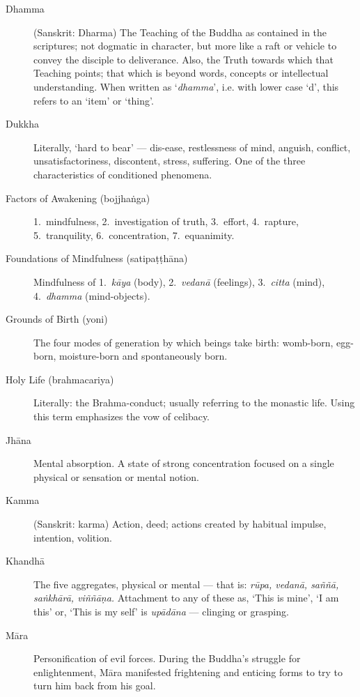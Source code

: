 \begin{description}
\item[Dhamma] (Sanskrit: Dharma) The Teaching of the Buddha as contained
  in the scriptures; not dogmatic in character, but more like a raft or
  vehicle to convey the disciple to deliverance. Also, the Truth towards
  which that Teaching points; that which is beyond words, concepts or
  intellectual understanding. When written as ‘\emph{dhamma}’, i.e.
  with lower case `d', this refers to an ‘item’ or ‘thing’.

\item[Dukkha] Literally, ‘hard to bear’ --- dis-ease, restlessness of
  mind, anguish, conflict, unsatisfactoriness, discontent, stress,
  suffering. One of the three characteristics of conditioned phenomena.

\item[Factors of Awakening (bojjhaṅga)] 1.~mindfulness, 2.~investigation of truth, 3.~effort, 4.~rapture, 5.~tranquility, 6.~concentration, 7.~equanimity.

\item[Foundations of Mindfulness (satipaṭṭhāna)] Mindfulness of 1.~\emph{kāya} (body), 2.~\emph{vedanā} (feelings), 3.~\emph{citta} (mind),
4.~\emph{dhamma} (mind-objects).

\item[Grounds of Birth (yoni)] The four modes of generation by which
  beings take birth: womb-born, egg-born, moisture-born and spontaneously born.

\item[Holy Life (brahmacariya)] Literally: the Brahma-conduct; usually
  referring to the monastic life. Using this term emphasizes the vow of
  celibacy.

\item[Jhāna] Mental absorption. A state of strong concentration focused
  on a single physical or sensation or mental notion.

\item[Kamma] (Sanskrit: karma) Action, deed; actions created by habitual
  impulse, intention, volition.

\item[Khandhā] The five aggregates, physical or mental ---
  that is: \emph{rūpa, vedanā, saññā, saṅkhārā, viññāṇa.} Attachment to
  any of these as, ‘This is mine’, ‘I am this’ or, ‘This is my self’ is
  \emph{upādāna} --- clinging or grasping.

\item[Māra] Personification of evil forces. During the Buddha’s struggle
  for enlightenment, Māra manifested frightening and enticing forms to
  try to turn him back from his goal.


\end{description}
